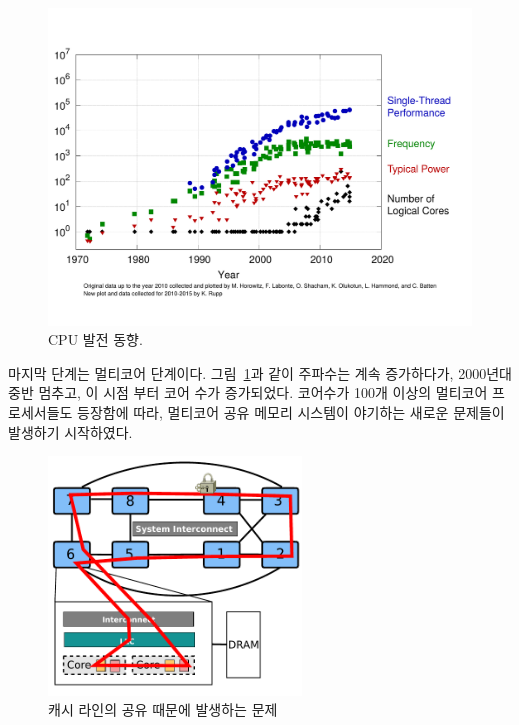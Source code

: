 \begin{figure}[h!]
  \begin{center}
    \includegraphics[scale=0.3]{fig/cpu}
  \end{center}
  \caption{CPU 발전 동향.}
  \label{fig:cpumany}
\end{figure}

마지막 단계는 멀티코어 단계이다.
그림~\ref{fig:cpumany}과 같이 주파수는 계속 증가하다가, 2000년대 중반 멈추고, 이 시점 부터 코어 수가 증가되었다. 
코어수가 100개 이상의 멀티코어 프로세서들도 등장함에 따라, 멀티코어 공유 
메모리 시스템이 야기하는 새로운 문제들이 발생하기 시작하였다.

\begin{figure}[h!]
    \centering
    \includegraphics[width=0.6\textwidth]{fig/archcache}
    \caption{캐시 라인의 공유 때문에 발생하는 문제}
  \label{shared_memory}
\end{figure}

